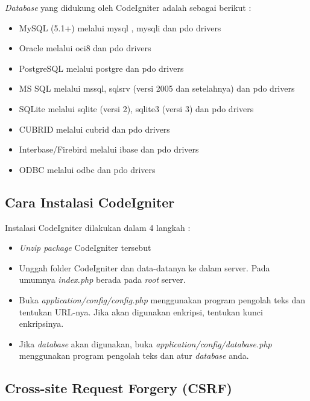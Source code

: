 \textit{Database} yang didukung oleh CodeIgniter adalah sebagai berikut :
\begin{itemize}
	\item MySQL (5.1+) melalui mysql , mysqli dan pdo drivers
	\item Oracle melalui oci8 dan pdo drivers
	\item PostgreSQL melalui postgre dan pdo drivers
	\item MS SQL melalui mssql, sqlsrv (versi 2005 dan setelahnya) dan pdo drivers
	\item SQLite melalui sqlite (versi 2), sqlite3 (versi 3) dan pdo drivers
	\item CUBRID melalui cubrid dan pdo drivers
	\item Interbase/Firebird melalui ibase dan pdo drivers
	\item ODBC melalui odbc dan pdo drivers
\end{itemize}

\subsection{Cara Instalasi CodeIgniter}
Instalasi CodeIgniter dilakukan dalam 4 langkah :
\begin{itemize}
	\item \textit{Unzip package} CodeIgniter tersebut \cite{CodeIgniter:17}
	\item Unggah folder CodeIgniter dan data-datanya ke dalam server. Pada umumnya \textit{index.php} berada pada \textit{root} server.\cite{CodeIgniter:17}
	\item Buka \textit{application/config/config.php} menggunakan program pengolah teks dan tentukan URL-nya. Jika akan digunakan enkripsi, tentukan kunci enkripsinya.\cite{CodeIgniter:17}
	\item Jika \textit{database} akan digunakan, buka \textit{application/config/database.php} menggunakan program pengolah teks dan atur \textit{database} anda.\cite{CodeIgniter:17}
\end{itemize}

\subsection{Cross-site Request Forgery (CSRF) }
